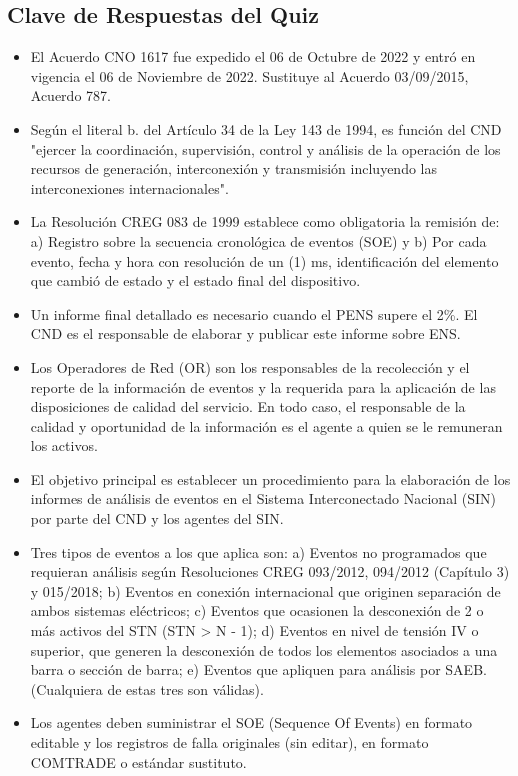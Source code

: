 \documentclass[a5paper]{book}%
\begin{document}
  \subsection{Clave de Respuestas del Quiz}

  \begin{itemize}

  \item El Acuerdo CNO 1617 fue expedido el 06 de Octubre de 2022 y entró en vigencia el 06 de Noviembre de 2022. Sustituye al Acuerdo 03/09/2015, Acuerdo 787.
  \item Según el literal b. del Artículo 34 de la Ley 143 de 1994, es función del CND "ejercer la coordinación, supervisión, control y análisis de la operación de los recursos de generación, interconexión y transmisión incluyendo las interconexiones internacionales".
  \item La Resolución CREG 083 de 1999 establece como obligatoria la remisión de: a) Registro sobre la secuencia cronológica de eventos (SOE) y b) Por cada evento, fecha y hora con resolución de un (1) ms, identificación del elemento que cambió de estado y el estado final del dispositivo.
  \item Un informe final detallado es necesario cuando el PENS supere el 2\%. El CND es el responsable de elaborar y publicar este informe sobre ENS.
  \item Los Operadores de Red (OR) son los responsables de la recolección y el reporte de la información de eventos y la requerida para la aplicación de las disposiciones de calidad del servicio. En todo caso, el responsable de la calidad y oportunidad de la información es el agente a quien se le remuneran los activos.
  \item El objetivo principal es establecer un procedimiento para la elaboración de los informes de análisis de eventos en el Sistema Interconectado Nacional (SIN) por parte del CND y los agentes del SIN.
  \item Tres tipos de eventos a los que aplica son: a) Eventos no programados que requieran análisis según Resoluciones CREG 093/2012, 094/2012 (Capítulo 3) y 015/2018; b) Eventos en conexión internacional que originen separación de ambos sistemas eléctricos; c) Eventos que ocasionen la desconexión de 2 o más activos del STN (STN > N - 1); d) Eventos en nivel de tensión IV o superior, que generen la desconexión de todos los elementos asociados a una barra o sección de barra; e) Eventos que apliquen para análisis por SAEB. (Cualquiera de estas tres son válidas).
  \item Los agentes deben suministrar el SOE (Sequence Of Events) en formato editable y los registros de falla originales (sin editar), en formato COMTRADE o estándar sustituto.

\end{itemize}
\end{document}
